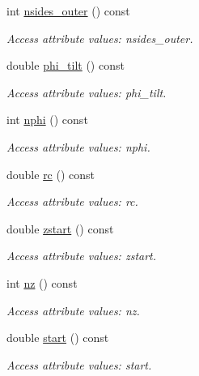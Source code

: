 \begin{DoxyCompactItemize}
int \hyperlink{struct_d_d4hep_1_1_x_m_l_1_1_child_value_add672bdaff4ad842527db3c3a693da51}{nsides\+\_\+outer} () const
\begin{DoxyCompactList}\small\item\em Access attribute values\+: nsides\+\_\+outer. \end{DoxyCompactList}\item 
double \hyperlink{struct_d_d4hep_1_1_x_m_l_1_1_child_value_a8780736e20fa48e4852cc00601b925a5}{phi\+\_\+tilt} () const
\begin{DoxyCompactList}\small\item\em Access attribute values\+: phi\+\_\+tilt. \end{DoxyCompactList}\item 
int \hyperlink{struct_d_d4hep_1_1_x_m_l_1_1_child_value_a70ed8c988b37d11ca0dfc11c5a367577}{nphi} () const
\begin{DoxyCompactList}\small\item\em Access attribute values\+: nphi. \end{DoxyCompactList}\item 
double \hyperlink{struct_d_d4hep_1_1_x_m_l_1_1_child_value_a12040c1388e0f8b88d3c75a2901cda7f}{rc} () const
\begin{DoxyCompactList}\small\item\em Access attribute values\+: rc. \end{DoxyCompactList}\item 
double \hyperlink{struct_d_d4hep_1_1_x_m_l_1_1_child_value_aa6843ea2c74b71d588f89257d971f344}{zstart} () const
\begin{DoxyCompactList}\small\item\em Access attribute values\+: zstart. \end{DoxyCompactList}\item 
int \hyperlink{struct_d_d4hep_1_1_x_m_l_1_1_child_value_a106df993449abf245551b83793482433}{nz} () const
\begin{DoxyCompactList}\small\item\em Access attribute values\+: nz. \end{DoxyCompactList}\item 
double \hyperlink{struct_d_d4hep_1_1_x_m_l_1_1_child_value_a2b05182b7406fbdaf4e823cba9a10ae5}{start} () const
\begin{DoxyCompactList}\small\item\em Access attribute values\+: start. \end{DoxyCompactList}\item 

\end{DoxyCompactItemize}
